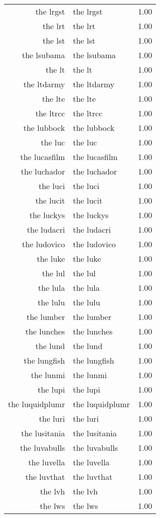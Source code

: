\begin{table}[ht]
\begin{tabular}{rlr}
  the lrgst & the lrgst & 1.00 \\ 
  the lrt & the lrt & 1.00 \\ 
  the lst & the lst & 1.00 \\ 
  the lsubama & the lsubama & 1.00 \\ 
  the lt & the lt & 1.00 \\ 
  the ltdarmy & the ltdarmy & 1.00 \\ 
  the lte & the lte & 1.00 \\ 
  the ltrcc & the ltrcc & 1.00 \\ 
  the lubbock & the lubbock & 1.00 \\ 
  the luc & the luc & 1.00 \\ 
  the lucasfilm & the lucasfilm & 1.00 \\ 
  the luchador & the luchador & 1.00 \\ 
  the luci & the luci & 1.00 \\ 
  the lucit & the lucit & 1.00 \\ 
  the luckys & the luckys & 1.00 \\ 
  the ludacri & the ludacri & 1.00 \\ 
  the ludovico & the ludovico & 1.00 \\ 
  the luke & the luke & 1.00 \\ 
  the lul & the lul & 1.00 \\ 
  the lula & the lula & 1.00 \\ 
  the lulu & the lulu & 1.00 \\ 
  the lumber & the lumber & 1.00 \\ 
  the lunches & the lunches & 1.00 \\ 
  the lund & the lund & 1.00 \\ 
  the lungfish & the lungfish & 1.00 \\ 
  the lunmi & the lunmi & 1.00 \\ 
  the lupi & the lupi & 1.00 \\ 
  the luquidplumr & the luquidplumr & 1.00 \\ 
  the luri & the luri & 1.00 \\ 
  the lusitania & the lusitania & 1.00 \\ 
  the luvabulls & the luvabulls & 1.00 \\ 
  the luvella & the luvella & 1.00 \\ 
  the luvthat & the luvthat & 1.00 \\ 
  the lvh & the lvh & 1.00 \\ 
  the lws & the lws & 1.00 \\ 

\end{tabular}
\end{table}
